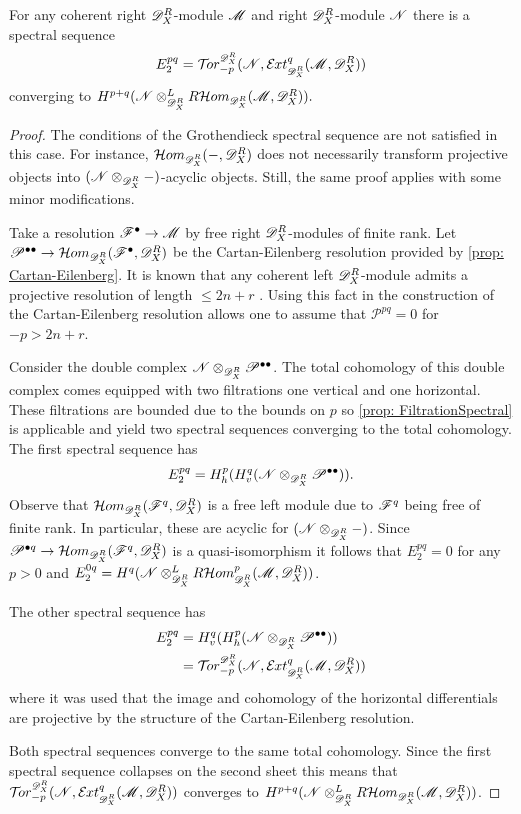  \begin{proposition}
   For any coherent right $\mathscr{D}_X^R$-module $\mathscr{M}$ and right $\mathscr{D}_X^R$-module $\mathscr{N}$ there is a spectral sequence
   $$E_2^{pq}= \Tr{\D_X^R}{-p}(\N,\Ex{\D_X^R}{q}(\M,\D_X^R)) $$
   converging to $H^{p+q} (\mathscr{N}\otimes_{\mathscr{D}_X^R}^L R\mathcal{H}om_{\mathscr{D}_X^R}(\mathscr{M},\mathscr{D}_X^R) ).$
 \end{proposition}
 \begin{proof}
   The conditions of the Grothendieck spectral sequence \cite[Corollary 5.8.4]{weibel1995introduction} are not satisfied in this case.
   For instance, $\Hom_{\sc{\D_X^R}}(\blank,\D_X^R)$ does not necessarily transform projective objects into $(\mathscr{N}\otimes_{\mathscr{D}_X^R}{-})$-acyclic objects.
   Still, the same proof applies with some minor modifications.

  Take a resolution $\mathscr{F}^\bullet \to \mathscr{M}$ by free right $\mathscr{D}_X^R$-modules of finite rank.
  Let $\mathscr{P}^{\bullet\bullet}\to \mathcal{H}om_{\mathscr{D}_X^R}(\mathscr{F}^{\bullet},\mathscr{D}_X^R)$ be the Cartan-Eilenberg resolution provided by \cref{prop: Cartan-Eilenberg}.
  It is known that any coherent left $\mathscr{D}_X^R$-module admits a projective resolution of length $\leq 2n + r$ \cite[p6]{budur2020zeroI}.
  Using this fact in the construction of the Cartan-Eilenberg resolution allows one to assume that $\mathscr{P}^{pq}=0$ for $-p>2n + r$.

  Consider the double complex $\mathscr{N}\otimes_{\mathscr{D}_X^R}\mathscr{P}^{\bullet \bullet}$.
  The total cohomology of this double complex comes equipped with two filtrations one vertical and one horizontal.
  These filtrations are bounded due to the bounds on $p$ so \cref{prop: FiltrationSpectral} is applicable and yield two spectral sequences converging to the total cohomology.
  The first spectral sequence has
  $$E_{2}^{pq} = H^p_h(H^q_v(\mathscr{N} \otimes_{\mathscr{D}_X^R}\mathscr{P}^{\bullet \bullet})).$$
  Observe that $\mathcal{H}om_{\mathscr{D}_X^R}(\mathscr{F}^q, \mathscr{D}_X^R)$ is a free left module due to $\mathscr{F}^q$ being free of finite rank.
  In particular, these are acyclic for $(\mathscr{N}\otimes_{\mathscr{D}_X^R}{-})$.
  Since $\mathscr{P}^{\bullet q}\to \mathcal{H}om_{\mathscr{D}_X^R}(\mathscr{F}^q,\mathscr{D}_X^R)$ is a quasi-isomorphism it follows that $E_2^{pq}=0$ for any $p>0$ and $E_2^{0q} = H^{q} (\mathscr{N}\otimes_{\mathscr{D}_X^R}^LR\mathcal{H}om_{\mathscr{D}_X^R}^p(\mathscr{M},\mathscr{D}_X^R) )$.

  The other spectral sequence has
  \begin{align*}
      E_2^{pq} &= H^q_v(H^p_h(\N\otimes_{\D_X^R}\mathscr{P}^{\bullet\bullet}))\\
      &=  \Tr{\D_X^R}{-p}(\N,\Ex{\D_X^R}{q}(\M,\D_X^R))
  \end{align*}
  where it was used that the image and cohomology of the horizontal differentials are projective by the structure of the Cartan-Eilenberg resolution.

  Both spectral sequences converge to the same total cohomology.
  Since the first spectral sequence collapses on the second sheet this means that $\Tr{\D_X^R}{-p}(\N,\Ex{\D_X^R}{q}(\M,\D_X^R))$ converges to $H^{p+q}( \mathscr{N}\otimes_{\mathscr{D}_X^R}^LR\mathcal{H}om_{\mathscr{D}_X^R}(\mathscr{M},\mathscr{D}_X^R) )$.
 \end{proof}
